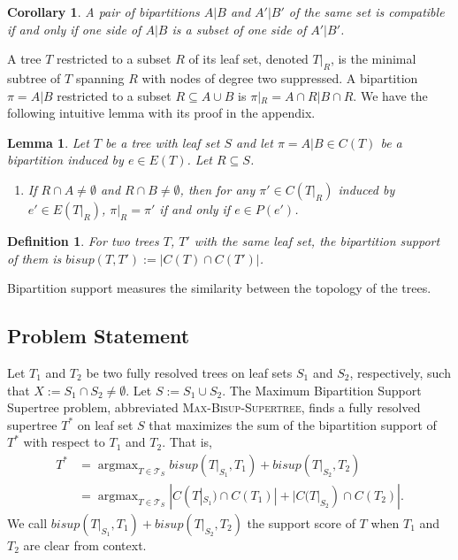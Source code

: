 \documentclass{article}
\DeclareMathOperator*{\argmax}{argmax}
\newcommand{\bs}{bisup}
\newtheorem{lemma}{Lemma}
\newtheorem{corollary}{Corollary}
\newtheorem{definition}{Definition}
\begin{document}
\begin{corollary}\label{cor:compatibility}
     A pair of bipartitions $A|B$ and $A'|B'$ of the same set is compatible if and only if one side of $A|B$ is a subset of one side of $A'|B'$.
\end{corollary}
\medskip

A tree $T$ restricted to a subset $R$ of its leaf set, denoted $T|_R$, is the minimal subtree of $T$ spanning $R$ with nodes of degree two suppressed. A bipartition $\pi = A|B$ restricted to a subset $R \subseteq A\cup B$ is $\pi|_R = A\cap R | B\cap R$. We have the following intuitive lemma with its proof in the appendix.

\begin{lemma}\label{lem:bipar_restrict_edge}
    Let $T$ be a tree with leaf set $S$ and let $\pi = A|B \in C(T)$ be a bipartition induced by $e \in E(T)$. Let $R \subseteq S$.
    \begin{enumerate}
        \item If $R \cap A \neq \emptyset$ and $R \cap B \neq \emptyset$, then for any $\pi' \in C(T|_R)$ induced by $e' \in E(T|_R)$, $\pi|_R = \pi'$ if and only if $e \in P(e')$.
    \end{enumerate}
\end{lemma}


\begin{definition}
For two trees $T$, $T'$ with the same leaf set, the \textit{bipartition support} of them is $\bs(T, T') := |C(T) \cap C(T')|$.
\end{definition}

Bipartition support measures the similarity between the topology of the trees.\\

\subsection{Problem Statement}
Let $T_1$ and $T_2$ be two fully resolved trees on leaf sets $S_1$ and $S_2$, respectively, such that $X := S_1 \cap S_2 \neq \emptyset$. Let $S := S_1 \cup S_2$. The Maximum Bipartition Support Supertree problem, abbreviated \textsc{Max-Bisup-Supertree}, finds a fully resolved supertree $T^*$ on leaf set $S$ that maximizes the sum of the bipartition support of $T^*$ with respect to $T_1$ and $T_2$. That is, 
\begin{align*}
    T^* &= \argmax_{T \in \mathcal{T}_S} \bs(T|_{S_1}, T_1) + \bs(T|_{S_2}, T_2)\\ 
        &= \argmax_{T \in \mathcal{T}_S} |C(T|_{S_1})\cap C(T_1)| + |C(T|_{S_2}) \cap C(T_2)|.
\end{align*}
We call $\bs(T|_{S_1}, T_1) + \bs(T|_{S_2}, T_2)$ the support score of $T$ when $T_1$ and $T_2$ are clear from context.
\end{document}
